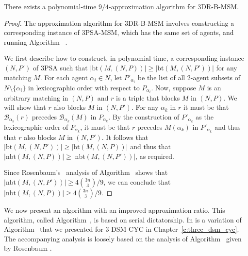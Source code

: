 \begin{thm}
\label{thm:threed_sr_b_approxalgofournine}
There exists a polynomial-time $9/4$-approximation algorithm for 3DR-B-MSM.
\end{thm}
\begin{proof}
The approximation algorithm for 3DR-B-MSM involves constructing a corresponding instance of 3PSA-MSM, which has the same set of agents, and running Algorithm~ \cite{rosenbaum16}.

We first describe how to construct, in polynomial time, a corresponding instance $(N, P')$ of 3PSA such that $|\textrm{bt}(M, (N, P))| \geq |\textrm{bt}(M, (N, P'))|$ for any matching $M$. For each agent $\alpha_i \in N$, let $P'_{\alpha_i}$ be the list of all $2$-agent subsets of $N \setminus \{ \alpha_i \}$ in lexicographic order with respect to $P_{\alpha_i}$. Now, suppose $M$ is an arbitrary matching in $(N, P)$ and $r$ is a triple that blocks $M$ in $(N, P)$. We will show that $r$ also blocks $M$ in $(N, P')$. For any $\alpha_k$ in $r$ it must be that $\mathscr{B}_{\alpha_k}(r)$ precedes $\mathscr{B}_{\alpha_k}(M)$ in  $P_{\alpha_k}$. By the construction of $P'_{\alpha_k}$ as the lexicographic order of $P_{\alpha_k}$, it must be that $r$ precedes $M(\alpha_k)$ in $P'_{\alpha_k}$ and thus that $r$ also blocks $M$ in $(N, P')$. It follows that $|\textrm{bt}(M, (N, P'))| \geq |\textrm{bt}(M, (N, P))|$ and thus that $|\textrm{nbt}(M, (N, P))| \geq |\textrm{nbt}(M, (N, P'))|$, as required.

Since Rosenbaum's~\cite{rosenbaum16} analysis of  Algorithm~ shows that $|\textrm{nbt}(M, (N, P'))| \geq 4\binom{3n}{3}/9$, we can conclude that $|\textrm{nbt}(M, (N, P))| \geq 4\binom{3n}{3}/9$.
\end{proof}

We now present an algorithm with an improved approximation ratio. This algorithm, called Algorithm~, is based on serial dictatorship. In is a variation of Algorithm~ that we presented for 3-DSM-CYC in Chapter~\ref{c:three_dsm_cyc}. The accompanying analysis is loosely based on the analysis of Algorithm~ given by Rosenbaum \cite{rosenbaum16}.

